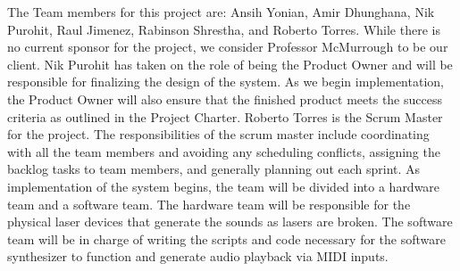 The Team members for this project are: Ansih Yonian, Amir Dhunghana, Nik Purohit, Raul Jimenez, Rabinson Shrestha, and Roberto Torres. While there is no current sponsor for the project, we consider Professor McMurrough to be our client. Nik Purohit has taken on the role of being the Product Owner and will be responsible for finalizing the design of the system. As we begin implementation, the Product Owner will also ensure that the finished product meets the success criteria as outlined in the Project Charter. Roberto Torres is the Scrum Master for the project. The responsibilities of the scrum master include coordinating with all the team members and avoiding any scheduling conflicts, assigning the backlog tasks to team members, and generally planning out each sprint. As implementation of the system begins, the team will be divided into a hardware team and a software team. The hardware team will be responsible for the physical laser devices that generate the sounds as lasers are broken. The software team will be in charge of writing the scripts and code necessary for the software synthesizer to function and generate audio playback via MIDI inputs.
